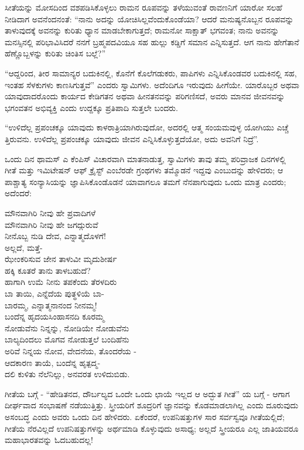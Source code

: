 ಸೀತೆಯನ್ನು ಮೋಸದಿಂದ ವಶಪಡಿಸಿಕೊಳ್ಳಲು ರಾಮನ ರೂಪವನ್ನು ತಳೆಯುವಂತೆ ರಾವಣನಿಗೆ ಯಾರೋ ಸಲಹೆ ನೀಡಿದಾಗ ಅವನೆಂದನಂತೆ: “ನಾನು ಅದನ್ನು ಯೋಚಿಸಿಲ್ಲವೆಂದುಕೊಂಡೆಯಾ? ಆದರೆ ಮನುಷ್ಯನೊಬ್ಬನ ರೂಪವನ್ನು ತಾಳುವುದಕ್ಕೆ ಅವನನ್ನು ಕುರಿತು ಧ್ಯಾನ ಮಾಡಬೇಕಾಗುತ್ತದೆ; ರಾಮನೋ ಸಾಕ್ಷಾತ್ ಭಗವಂತ; ನಾನು ಅವನನ್ನು ಮನಸ್ಸಿನಲ್ಲಿ ಪರಿಭಾವಿಸಿದರೆ ನನಗೆ ಬ್ರಹ್ಮಪದವಿಯೂ ಸಹ ಹುಲ್ಲು ಕಡ್ಡಿಗೆ ಸಮಾನ ಎನ್ನಿಸುತ್ತದೆ. ಆಗ ನಾನು ಹೇಗೆತಾನೆ ಹೆಣ್ಣೊಬ್ಬಳನ್ನು ಕುರಿತು ಚಿಂತಿಸ ಬಲ್ಲೆ?”

“ಆದ್ದರಿಂದ, ತೀರ ಸಾಮಾನ್ಯರ ಬದುಕಿನಲ್ಲಿ, ಕೊನೆಗೆ ಕೊಲೆಗಡುಕರು, ಪಾಪಿಗಳು ಎನ್ನಿಸಿಕೊಂಡವರ ಬದುಕಿನಲ್ಲಿ ಸಹ, ಇಂತಹ ಸೆಳಕುಗಳು ಕಾಣಸಿಗುತ್ತವೆ” ಎಂದರು ಸ್ವಾಮಿಗಳು. ಅದೆಂದಿಗೂ ಇರುವುದು ಹೀಗೆಯೇ. ಯಾರೊಬ್ಬರ ಅಥವಾ ಯಾವುದಾದರೊಂದು ಕಾರ್ಯದ ಕೇಡಿಗತನ ಅಥವಾ ಹೀನತನವನ್ನು ಪರಿಗಣಿಸದೆ, ಅವರು ಮಾನವ ಜೀವನವನ್ನು ಭಗಂವತನ ಅಭಿವ್ಯಕ್ತಿ ಎಂದು ಉದ್ದಕ್ಕೂ ಪ್ರತಿಪಾದಿ ಸುತ್ತಲೇ ಬಂದರು.

“ಉಳಿದೆಲ್ಲ ಪ್ರಪಂಚಕ್ಕೂ ಯಾವುದು ಕಾಳರಾತ್ರಿಯಾಗಿರುವುದೋ, ಅದರಲ್ಲಿ ಆತ್ಮ ಸಂಯಮವುಳ್ಳ ಯೋಗಿಯು ಎಚ್ಚೆ ತ್ತಿರುವನು. ಉಳಿದೆಲ್ಲ ಪ್ರಪಂಚಕ್ಕೂ ಯಾವುದು ಜೀವನ ಎನ್ನಿಸಿಕೊಳ್ಳುತ್ತದೆಯೋ, ಅದು ಅವನಿಗೆ ನಿದ್ರೆ”.

ಒಂದು ದಿನ ಥಾಮಸ್ ಎ ಕೆಂಪಿಸ್ ವಿಚಾರವಾಗಿ ಮಾತನಾಡುತ್ತ, ಸ್ವಾಮಿಗಳು ತಾವು ತಮ್ಮ ಪರಿವ್ರಾಜಕ ದಿನಗಳಲ್ಲಿ ಗೀತೆ ಮತ್ತು ಇಮಿಟೇಷನ್ ಆಫ್ ಕ್ರೈಸ್ಟ್ ಎಂಬೆರಡೇ ಗ್ರಂಥಗಳು ತಮ್ಮೊಡನೆ ಇದ್ದವು ಎಂಬುದನ್ನು ಹೇಳಿದರು; ಆ ಪಾಶ್ಚಾತ್ಯ ಸಂನ್ಯಾಸಿಯನ್ನು ಜ್ಞಾಪಿಸಿಕೊಂಡೊಡನೆ ಯಾವಾಗಲೂ ತಮಗೆ ನೆನಪಾಗುವುದು ಒಂದು ಮಾತ್ರ ಎಂದರು; ಅದೆಂದರೆ:

\begin{myquote}
ಮೌನವಾಗಿರಿ ನೀವು ಹೇ ಪ್ರವಾದಿಗಳೆ\\ಮೌನವಾಗಿರಿ ನೀವು ಹೇ ಜಗದ್ಗುರುವೆ\\ನೀನೊಬ್ಬ ನುಡಿ ದೇವ, ಎನ್ನಾತ್ಮದೊಳಗೆ!\\ಅಲ್ಲದೆ, ಮತ್ತೆ-\\ಝೇಂಕರಿಸುವ ಜೇನ ತಾಳುವೀ ಮೃದುಶೀರ್ಷ\\ಹಕ್ಕಿ ಕೂತರೆ ತಾನು ತಾಳಬಹುದೆ?\\ಹಾಗಾಗಿ ಉಮೆ ನೀನು ತಪಕೆಂದು ತೆರಳದಿರು\\ಬಾ ತಾಯಿ, ಎನ್ನೆದೆಯ ಪುತ್ಥಳಿಯೆ ಬಾ-\\ಬಾರಮ್ಮ, ಎನ್ನಾತ್ಮನಾನಂದ ನೀನಮ್ಮ!\\ಬಂದೆನ್ನ ಹೃದಯಸಿಂಹಾಸನದಿ ಕೂರಮ್ಮ\\ನೋಡುವೆನು ನಿನ್ನನ್ನು, ನೋಡಿಯೇ ನೋಡುವೆನು\\ಬಾಲ್ಯದಿಂದಲು ಮೊಗವ ನೋಡುತ್ತಲೆ ಬಂದಿಹೆನು\\ಅರಿವೆ ನಿನ್ನಯ ನೋವ, ವೇದನೆಯ, ತೊಂದರೆಯ -\\ಆದಕಾರಣ ತಾಯೆ, ಬಂದೆನ್ನ ಹೃತ್ಪದ್ಮ-\\ದಲಿ ಕುಳಿತು ನೆಲೆನಿಲ್ಲು, ಅನವರತ ಉಳಿದುಬಿಡು.
\end{myquote}

ಗೀತೆಯ ಬಗ್ಗೆ - “ಹೇಡಿತನದ, ದೌರ್ಬಲ್ಯದ ಒಂದೇ ಒಂದು ಛಾಯೆ ಇಲ್ಲದ ಆ ಅದ್ಭುತ ಗೀತೆ” ಯ ಬಗ್ಗೆ - ಆಗಾಗ ದೀರ್ಘವಾದ ಸಂಭಾಷಣೆ ನಡೆಯುತ್ತಿತ್ತು. ಸ್ತ್ರೀಯರಿಗೆ ಶೂದ್ರರಿಗೆ ಜ್ಞಾನವನ್ನು ಕೊಡಮಾಡಲಾಗಿಲ್ಲ ಎಂದು ದೂರುವುದು ಅಸಂಬದ್ಧ ಎಂದು ಅವರು ಒಂದು ದಿನ ಹೇಳಿದರು. ಏಕೆಂದರೆ, ಉಪನಿಷತ್ತುಗಳ ಸಾರ ಸರ್ವಸ್ವವೂ ಗೀತೆಯಲ್ಲಿದೆ; ಗೀತೆಯ ನೆರವಿಲ್ಲದೆ ಉಪನಿಷತ್ತುಗಳನ್ನು ಅರ್ಥಮಾಡಿ ಕೊಳ್ಳುವುದು ಅಸಾಧ್ಯ; ಅಲ್ಲದೆ ಸ್ತ್ರೀಯರೂ ಎಲ್ಲ ಜಾತಿಯವರೂ ಮಹಾಭಾರತವನ್ನು ಓದಬಹುದಲ್ಲ!

